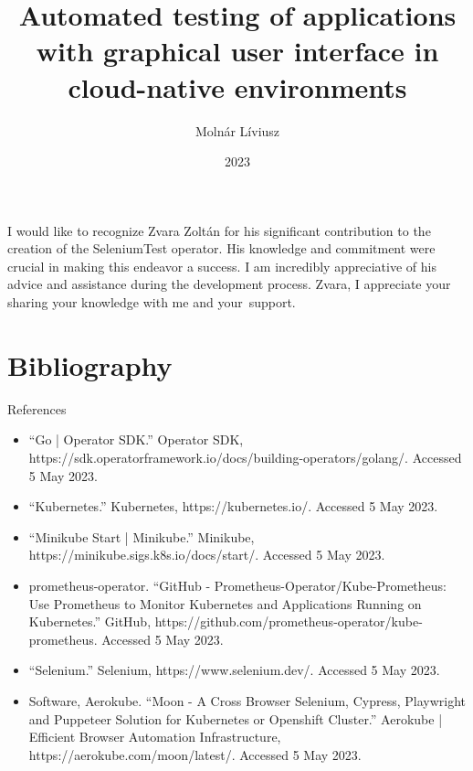 \documentclass[
]{elteikthesis}[2023/04/10]
\title{Automated testing of applications with graphical user interface in cloud-native environments} %
\date{2023} %
\author{Molnár Líviusz}
\affiliation{Associate Professor} %
\begin{document}


\maketitle
%

\tableofcontents
\cleardoublepage


\cleardoublepage


\cleardoublepage


\cleardoublepage


\cleardoublepage

\chapter*{\acklabel}
I would like to recognize Zvara Zoltán for his significant contribution to the creation of the SeleniumTest operator. His knowledge and commitment were crucial in making this endeavor a success. I am incredibly appreciative of his advice and assistance during the development process. Zvara, I appreciate your sharing your knowledge with me and your support.
\cleardoublepage
{}
\chapter{Bibliography}
\label{Bibliography}
References
\begin{itemize}
    \item “Go | Operator SDK.” Operator SDK, https://sdk.operatorframework.io/docs/building-operators/golang/. Accessed 5 May 2023.
    \item “Kubernetes.” Kubernetes, https://kubernetes.io/. Accessed 5 May 2023.
    \item “Minikube Start | Minikube.” Minikube, https://minikube.sigs.k8s.io/docs/start/. Accessed 5 May 2023.
    \item prometheus-operator. “GitHub - Prometheus-Operator/Kube-Prometheus: Use Prometheus to Monitor Kubernetes and Applications Running on Kubernetes.” GitHub, https://github.com/prometheus-operator/kube-prometheus. Accessed 5 May 2023.
    \item “Selenium.” Selenium, https://www.selenium.dev/. Accessed 5 May 2023.
    \item Software, Aerokube. “Moon - A Cross Browser Selenium, Cypress, Playwright and Puppeteer Solution for Kubernetes or Openshift Cluster.” Aerokube | Efficient Browser Automation Infrastructure, https://aerokube.com/moon/latest/. Accessed 5 May 2023.
\end{itemize}
\printbibliography[title=\biblabel]
\cleardoublepage
\end{document}
